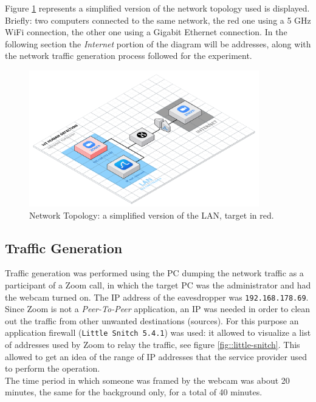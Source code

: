 \documentclass{article}
\begin{document}
Figure \ref{fig::net-topology} represents a simplified version of the network topology used is displayed. Briefly: two computers connected to the same network, the red one using a 5 GHz WiFi connection, the other one using a Gigabit Ethernet connection. In the following section the \textit{Internet} portion of the diagram will be addresses, along with the network traffic generation process followed for the experiment.

\begin{figure}[h]
	\centering
	\includegraphics[width=10cm]{assets/Spy-Your-Mate-Topology.png}
	\caption{Network Topology: a simplified version of the LAN, target in red.}
	\label{fig::net-topology}
\end{figure}

\subsection[]{Traffic Generation}

Traffic generation was performed using the PC dumping the network traffic as a participant of a Zoom call, in which the target PC was the administrator and had the webcam turned on. The IP address of the eavesdropper was \texttt{192.168.178.69}. Since Zoom is not a \textit{Peer-To-Peer} application, an IP was needed in order to clean out the traffic from other unwanted destinations (sources). For this purpose an application firewall (\texttt{Little Snitch 5.4.1}) was used: it allowed to visualize a list of addresses used by Zoom to relay the traffic, see figure \ref{fig::little-snitch}. This allowed to get an idea of the range of IP addresses that the service provider used to perform the operation. \\ The time period in which someone was framed by the webcam was about 20 minutes, the same for the background only, for a total of 40 minutes.
\end{document}
